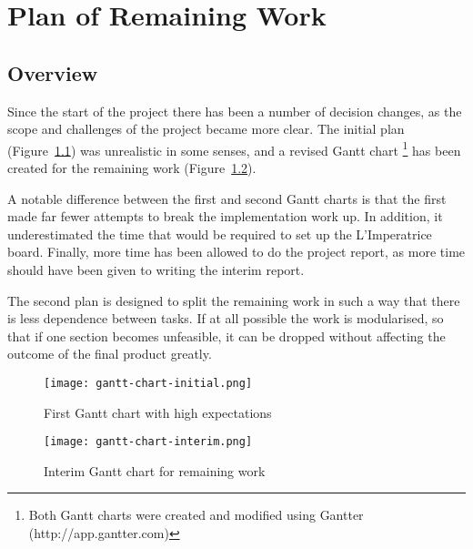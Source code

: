 \chapter{Plan of Remaining Work} %
\label{cha:plan_of_remaining_work}



\section{Overview} %
\label{sec:overview}
Since the start of the project there has been a number of decision changes, as the scope and challenges of the project became more clear.  The initial plan (Figure~\ref{fig:gantt1}) was unrealistic in some senses, and a revised Gantt chart \footnote{Both Gantt charts were created and modified using Gantter (http://app.gantter.com)} has been created for the remaining work (Figure~\ref{fig:gantt2}). 

A notable difference between the first and second Gantt charts is that the first made far fewer attempts to break the implementation work up.  In addition, it underestimated the time that would be required to set up the L'Imperatrice board.  Finally, more time has been allowed to do the project report, as more time should have been given to writing the interim report.

The second plan is designed to split the remaining work in such a way that there is less dependence between tasks.  If at all possible the work is modularised, so that if one section becomes unfeasible, it can be dropped without affecting the outcome of the final product greatly.


\begin{figure}[tb]
	\begin{center}
		\texttt{[image: gantt-chart-initial.png]}
	\end{center}
	\caption{First Gantt chart with high expectations}
	\label{fig:gantt1}
\end{figure}

\begin{figure}[tb]
	\begin{center}
		\texttt{[image: gantt-chart-interim.png]}
	\end{center}
	\caption{Interim Gantt chart for remaining work}
	\label{fig:gantt2}
\end{figure}


